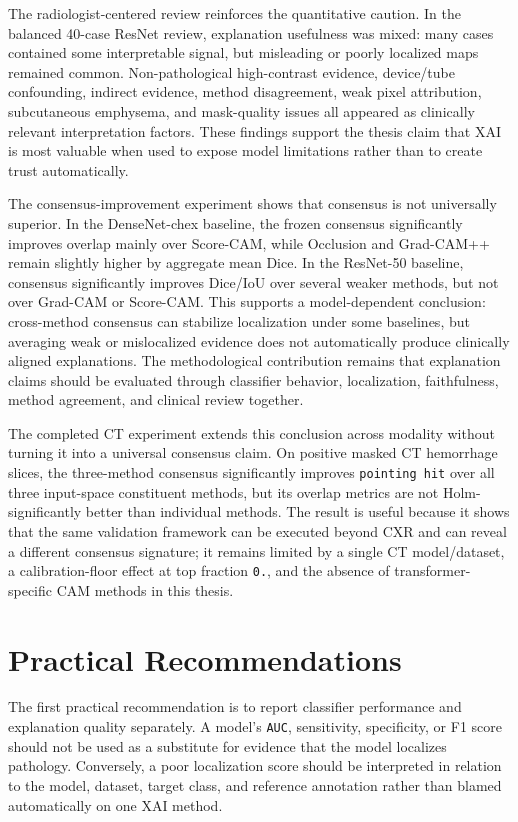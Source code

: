 The radiologist-centered review reinforces the quantitative caution. In
the balanced 40-case ResNet review, explanation usefulness was mixed:
many cases contained some interpretable signal, but misleading or poorly
localized maps remained common. Non-pathological high-contrast evidence,
device/tube confounding, indirect evidence, method disagreement, weak
pixel attribution, subcutaneous emphysema, and mask-quality issues all
appeared as clinically relevant interpretation factors. These findings
support the thesis claim that XAI is most valuable when used to expose
model limitations rather than to create trust automatically.

The consensus-improvement experiment shows that consensus is
not universally superior. In the DenseNet-chex baseline, the frozen
consensus significantly improves overlap mainly over
Score-CAM, while Occlusion and
Grad-CAM++ remain slightly higher by aggregate mean
Dice. In the ResNet-50 baseline, consensus significantly improves
Dice/IoU over several weaker methods, but not over Grad-CAM or
Score-CAM. This supports a model-dependent conclusion:
cross-method consensus can stabilize localization under some baselines,
but averaging weak or mislocalized evidence does not automatically
produce clinically aligned explanations. The methodological contribution
remains that explanation claims should be evaluated through classifier
behavior, localization, faithfulness, method agreement, and clinical
review together.

The completed CT experiment extends this conclusion across modality without
turning it into a universal consensus claim. On positive masked CT
hemorrhage slices, the three-method consensus significantly improves
\texttt{pointing \allowbreak hit} over all three input-space constituent methods,
but its overlap metrics are not Holm-significantly better than
individual methods. The result is useful because it shows that the same
validation framework can be executed beyond CXR and can reveal a
different consensus signature; it remains limited by a single CT
model/dataset, a calibration-floor effect at top fraction \texttt{0.},
and the absence of transformer-specific CAM methods in this
thesis.

\hypertarget{practical-recommendations}{%
	\section{Practical Recommendations}\label{practical-recommendations}}

The first practical recommendation is to report classifier performance
and explanation quality separately. A model's \texttt{AUC}, sensitivity,
specificity, or F1 score should not be used as a substitute for evidence
that the model localizes pathology. Conversely, a poor localization
score should be interpreted in relation to the model, dataset, target
class, and reference annotation rather than blamed automatically on one
XAI method.

